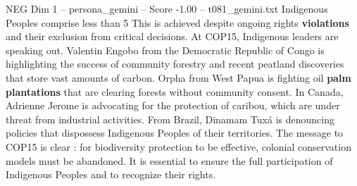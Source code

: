 \begin{textsample}{NEG Dim 1 – persona\_gemini – Score -1.00 – t081\_gemini.txt}  \label{ex:f1_neg_020}
Indigenous Peoples comprise less than 5 %
This is achieved despite ongoing rights \textbf{violations} and their exclusion from critical decisions.
At COP15, Indigenous leaders are speaking out.
Valentin Engobo from the Democratic Republic of Congo is highlighting the success of community forestry and recent peatland discoveries that store vast amounts of carbon.
Orpha from West Papua is fighting oil \textbf{palm} \textbf{plantations} that are clearing forests without community consent.
In Canada, Adrienne Jerome is advocating for the protection of caribou, which are under threat from industrial activities.
From Brazil, Dinamam Tuxá is denouncing policies that dispossess Indigenous Peoples of their territories.
The message to COP15 is clear : for biodiversity protection to be effective, colonial conservation models must be abandoned.
It is essential to ensure the full participation of Indigenous Peoples and to recognize their rights.

\end{textsample}
